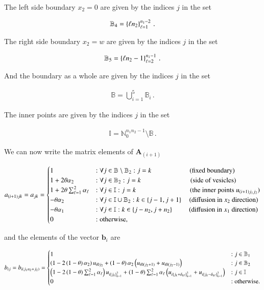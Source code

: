 \documentclass[11pt,english,a4paper]{article}
\begin{document}
\begin{flushleft}
The left side boundary $x_2=0$ are given by the indices $j$ in the set

\begin{align*}
\mathbb{B}_4 = \left\lbrace{\ell n_2}\right\rbrace_{\ell=1}^{n_1-2} \,.
\end{align*}

The right side boundary $x_2=w$ are given by the indices $j$ in the set

\begin{align*}
\mathbb{B}_5 = \left\lbrace{\ell n_2 - 1}\right\rbrace_{\ell=2}^{n_1-1}\,.
\end{align*}

And the boundary as a whole are given by the indices $j$ in the set

\begin{align*}
\mathbb{B} = \bigcup_{i=1}^5 \mathbb{B}_i \,.
\end{align*}

The inner points are given by the indices $j$ in the set

\begin{align*}
\mathbb{I} = \mathbb{N}_{0}^{n_1 n_2 -1} \setminus \mathbb{B}\,.
\end{align*}

We can now write the matrix elements of $\textbf{A}_{(i+1)}$

\begin{align}
a_{(i+1)jk} = a_{jk} = \begin{cases} 
1 &:\forall j\in\mathbb{B}\setminus\mathbb{B}_2  : j=k \,\,\,\,\quad\qquad\qquad \text{(fixed boundary)}\\
1+ 2\theta \alpha_2 &: \forall j\in\mathbb{B}_2: j=k \,\,\quad\qquad\qquad\qquad (\text{side of vesicles}) \\ 
1+ 2\theta \sum_{\ell = 1}^2 \alpha_\ell &: \forall j\in\mathbb{I}: j=k \qquad\qquad\qquad\qquad (\text{the inner points }u_{(i+1)j_1j_2}) \\ 
-\theta \alpha_2 &: \forall j\in\mathbb{I}\cup\mathbb{B}_2: k\in\left\lbrace{j-1,j+1}\right\rbrace\quad \text{(diffusion in $x_2$ direction)} \\ 
- \theta \alpha_1 &: \forall j\in\mathbb{I} : k \in \left\lbrace{j-n_2,j+n_2}\right\rbrace \,\,\qquad\text{(diffusion in $x_1$ direction)} \\
 0 & : \text{otherwise,} \end{cases}
\label{eq_23}
\end{align}

and the elements of the vector $\textbf{b}_i$ are

\begin{align}
b_{ij} = b_{i(j_1 n_2 + j_2)} = \begin{cases}
1 &: j\in\mathbb{B}_1 \\
\left({1-2\left({1-\theta}\right)\alpha_2}\right) u_{i0j_2} + \left({1-\theta}\right)\alpha_2\left({u_{i0(j_2+1)} + u_{i0(j_2-1)}}\right) &: j\in\mathbb{B}_2 \\
\left({1-2\left({1-\theta}\right)\sum_{\ell = 1}^2 \alpha_\ell}\right) u_{i\left\lbrace{j_k}\right\rbrace_{k=1}^2} + \left({1-\theta}\right)\sum_{\ell=1}^2\alpha_\ell\left({u_{i\left\lbrace{j_k+\delta_{k\ell}}\right\rbrace_{k=1}^2} + u_{i\left\lbrace{j_k-\delta_{k\ell}}\right\rbrace_{k=1}^2}}\right) &: j\in\mathbb{I} \\
0 &: \text{otherwise.}
\end{cases}
\label{eq_24}
\end{align}


\end{flushleft}
\end{document}

